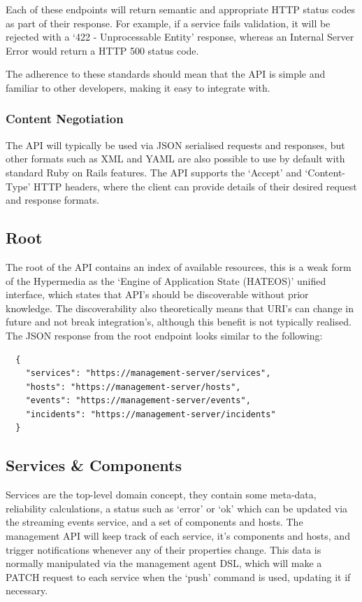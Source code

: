 \documentclass{cshonours}
\begin{document}
Each of these endpoints will return semantic and appropriate HTTP status codes as part of their response. For example, if a service fails validation, it will be rejected with a `422 - Unprocessable Entity' response, whereas an Internal Server Error would return a HTTP 500 status code.

The adherence to these standards should mean that the API is simple and familiar to other developers, making it easy to integrate with.

\subsubsection{Content Negotiation}

The API will typically be used via JSON serialised requests and responses, but other formats such as XML and YAML are also possible to use by default with standard Ruby on Rails features. The API supports the `Accept' and `Content-Type' HTTP headers, where the client can provide details of their desired request and response formats.

\subsection{Root}
\label{json}

The root of the API contains an index of available resources, this is a weak form of the Hypermedia as the `Engine of Application State (HATEOS)' unified interface, which states that API's should be discoverable without prior knowledge. The discoverability also theoretically means that URI's can change in future and not break integration's, although this benefit is not typically realised. The JSON response from the root endpoint looks similar to the following:

\begin{listing}[h]
\begin{verbatim}
  {
    "services": "https://management-server/services",
    "hosts": "https://management-server/hosts",
    "events": "https://management-server/events",
    "incidents": "https://management-server/incidents"
  }
\end{verbatim}
\end{listing}

\subsection{Services \& Components}

Services are the top-level domain concept, they contain some meta-data, reliability calculations, a status such as `error' or `ok' which can be updated via the streaming events service, and a set of components and hosts. The management API will keep track of each service, it's components and hosts, and trigger notifications whenever any of their properties change. This data is normally manipulated via the management agent DSL, which will make a PATCH request to each service when the `push' command is used, updating it if necessary.
\end{document}
